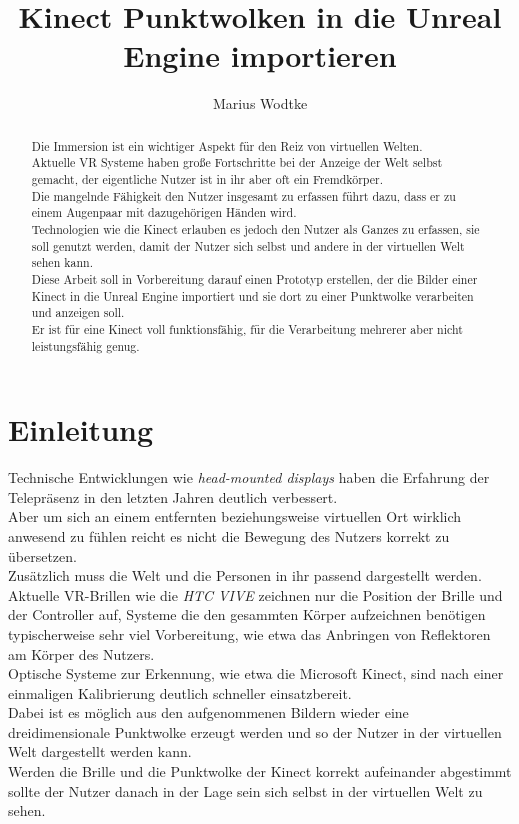 \documentclass[a4paper]{IEEEtran}
\title{Kinect Punktwolken in die Unreal Engine importieren}
\author{Marius Wodtke}
\begin{document}
\maketitle

\begin{abstract}
	Die Immersion ist ein wichtiger Aspekt für den Reiz von virtuellen Welten. \\
	Aktuelle VR Systeme haben große Fortschritte bei der Anzeige der Welt selbst gemacht, der eigentliche Nutzer ist in ihr aber oft ein Fremdkörper.\\
	Die mangelnde Fähigkeit den Nutzer insgesamt zu erfassen führt dazu, dass er zu einem Augenpaar mit dazugehörigen Händen wird. \\
	Technologien wie die Kinect erlauben es jedoch den Nutzer als Ganzes zu erfassen, sie soll genutzt werden, damit der Nutzer sich selbst und andere in der virtuellen Welt sehen kann.\\
	Diese Arbeit soll in Vorbereitung darauf einen Prototyp erstellen, der die Bilder einer Kinect in die Unreal Engine importiert und sie dort zu einer Punktwolke verarbeiten und anzeigen soll.\\
	Er ist für eine Kinect voll funktionsfähig, für die Verarbeitung mehrerer aber nicht leistungsfähig genug.\\
\end{abstract}

\section{Einleitung}
	Technische Entwicklungen wie {\textit{head-mounted displays}} haben die Erfahrung der Telepräsenz in den letzten Jahren deutlich verbessert. \\
	Aber um sich an einem entfernten beziehungsweise virtuellen Ort wirklich anwesend zu fühlen reicht es nicht die Bewegung des Nutzers korrekt zu übersetzen. \\
	Zusätzlich muss die Welt und die Personen in ihr passend dargestellt werden. \\
	Aktuelle VR-Brillen wie die \textit{HTC VIVE} zeichnen nur die Position der Brille und der Controller auf, Systeme die den gesammten Körper aufzeichnen benötigen typischerweise sehr viel Vorbereitung, wie etwa das Anbringen von Reflektoren am Körper des Nutzers. \\
	Optische Systeme zur Erkennung, wie etwa die Microsoft Kinect, sind nach einer einmaligen Kalibrierung deutlich schneller einsatzbereit. \\
	Dabei ist es möglich aus den aufgenommenen Bildern wieder eine dreidimensionale Punktwolke erzeugt werden und so der Nutzer in der virtuellen Welt dargestellt werden kann. \\
	Werden die Brille und die Punktwolke der Kinect korrekt aufeinander abgestimmt sollte der Nutzer danach in der Lage sein sich selbst in der virtuellen Welt zu sehen.\\
\end{document}
